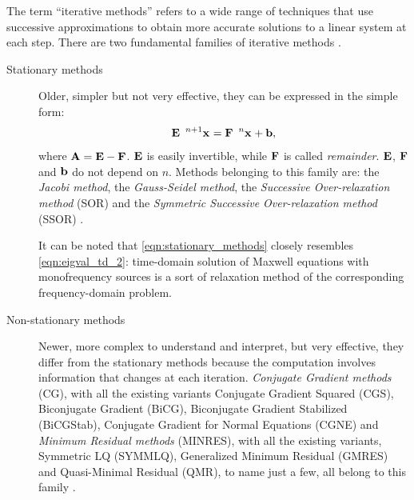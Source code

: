 The term ``iterative methods'' refers to a
wide range of techniques that use successive approximations to obtain
more accurate solutions to a linear system at each step. There are two
fundamental families of iterative methods \cite{barrett_templates}.
\begin{description}
\item[Stationary methods] Older,
  simpler but not very effective, they can be expressed in the simple
  form:
  \begin{equation} \label{eqn:stationary_methods}
    \Prod{\Matrix{E}}{\Disc{\Array{x}}{}{n+1}} =
    \Prod{\Matrix{F}}{\Disc{\Array{x}}{}{n}} + \Array{b} ,
  \end{equation}
  where $\Matrix{A} = \Matrix{E} - \Matrix{F}$. $\Matrix{E}$ is easily
  invertible, while $\Matrix{F}$ is called
  \emph{remainder}. $\Matrix{E}$, $\Matrix{F}$ and $\Array{b}$ do not
  depend on $n$. Methods belonging to this family are: the
  \emph{Jacobi method}, the \emph{Gauss-Seidel method}, the
  \emph{Successive Over-relaxation method} (SOR) and the
  \emph{Symmetric Successive Over-relaxation method} (SSOR)
  \cite{barrett_templates}.

  It can be noted that \eqref{eqn:stationary_methods} closely
  resembles \eqref{eqn:eigval_td_2}: time-domain solution of
  Maxwell equations with monofrequency sources is a sort of
  relaxation method of the corresponding frequency-domain problem.
\item[Non-stationary methods]
  Newer, more complex to understand and interpret, but very effective,
  they differ from the stationary methods because the computation
  involves information that changes at each iteration. \emph{Conjugate
  Gradient methods} (CG), with all the existing variants Conjugate
  Gradient Squared (CGS), Biconjugate Gradient (BiCG), Biconjugate
  Gradient Stabilized (BiCGStab), Conjugate Gradient for Normal
  Equations (CGNE) and \emph{Minimum Residual methods} (MINRES), with
  all the existing variants, Symmetric LQ (SYMMLQ), Generalized
  Minimum Residual (GMRES) and Quasi-Min\-i\-mal Residual (QMR), to name
  just a few, all belong to this family \cite{barrett_templates}.
\end{description}

